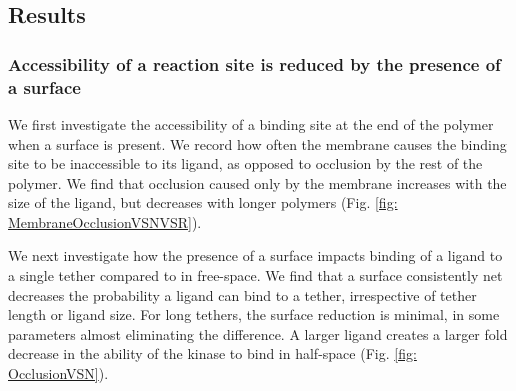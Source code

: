 \documentclass[../../AdvancementSummary.tex]{subfiles}
\begin{document}
%
%



\subsection{Results}

\subsubsection{Accessibility of a reaction site is reduced by the presence of a surface}

We first investigate the accessibility of a binding site at the end of the polymer when a surface is present. We record how often the membrane causes the binding site to be inaccessible to its ligand, as opposed to occlusion by the rest of the polymer. We find that occlusion caused only by the membrane increases with the size of the ligand, but decreases with longer polymers (Fig. \ref{fig: MembraneOcclusionVSNVSR}). 

We next investigate how the presence of a surface impacts binding of a ligand to a single tether compared to in free-space. We find that a surface consistently net decreases the probability a ligand can bind to a tether, irrespective of tether length or ligand size. For long tethers, the surface reduction is minimal, in some parameters almost eliminating the difference. A larger ligand creates a larger fold decrease in the ability of the kinase to bind in half-space (Fig. \ref{fig: OcclusionVSN}).
\end{document}
